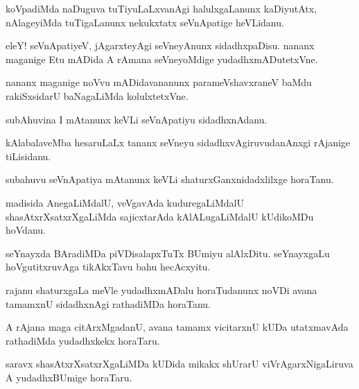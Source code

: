 \documentclass{article}
\begin{document}
\begin{mn}%
koVpadiMda naDuguva tuTiyuLaLxvanAgi halulxgaLanunx kaDiyutAtx, nAlageyiMda tuTigaLanunx 
nekukxtatx seVnApatige heVLidanu.
\end{mn}

\begin{mn}%
eleY! seVnApatiyeV, jAgarxteyAgi seVneyAnunx sidadhxpaDisu. nananx maganige Etu mADida A 
rAmana seVneyoMdige yudadhxmADutetxVne.
\end{mn}

\begin{mn}%
nananx maganige noVvu mADidavananunx parameVshavxraneV baMdu rakiSxsidarU baNagaLiMda 
kolulxtetxVne.
\end{mn}

\begin{mn}%
subAhuvina I mAtanunx keVLi seVnApatiyu sidadhxnAdanu. 
\end{mn}

\begin{mn}%
kAlabalaveMba hesaruLaLx tananx seVneyu sidadhxvAgiruvudanAnxgi rAjanige tiLisidanu.
\end{mn}

\begin{mn}%
subahuvu seVnApatiya mAtanunx keVLi shaturxGanxnidadxlilxge horaTanu.
\end{mn}

\begin{mn}%
madisida AnegaLiMdalU, veVgavAda kuduregaLiMdalU shasAtxrXsatxrXgaLiMda sajicxtarAda 
kAlALugaLiMdalU kUdikoMDu hoVdanu.
\end{mn}

\begin{mn}%
seYnayxda BAradiMDa piVDisalapxTuTx BUmiyu alAlxDitu. seYnayxgaLu hoVgutitxruvAga 
tikAkxTavu bahu hecAcxyitu.
\end{mn}

\begin{mn}%
rajanu shaturxgaLa meVle yudadhxmADalu horaTudanunx noVDi avana tamamxnU sidadhxnAgi 
rathadiMDa horaTanu.
\end{mn}

\begin{mn}%
A rAjana maga citArxMgadanU, avana tamamx vicitarxnU kUDa utatxmavAda rathadiMda 
yudadhxkekx horaTaru.
\end{mn}

\begin{mn}%
saravx shasAtxrXsatxrXgaLiMDa kUDida mikakx shUrarU viVrAgarxNigaLiruva A yudadhxBUmige 
horaTaru.
\end{mn}
\end{document}
